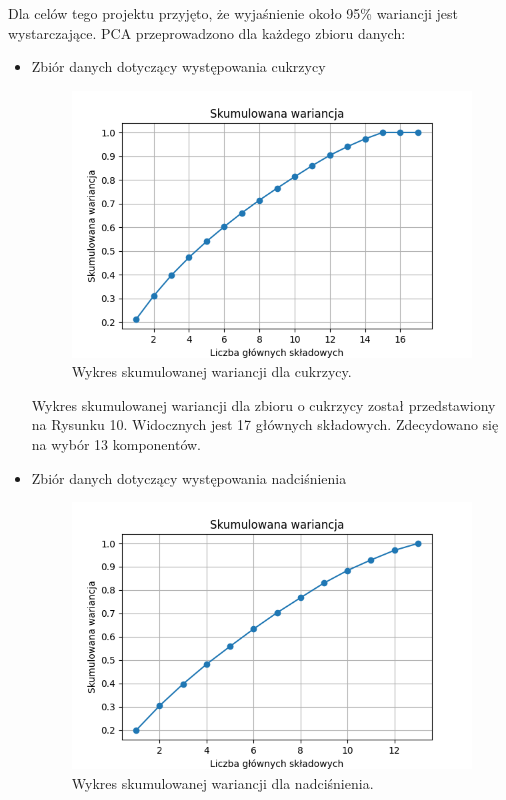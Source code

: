 \documentclass[onecolumn,12pt]{article}
\begin{document}
\vspace{8pt}
\noindent
Dla celów tego projektu przyjęto, że wyjaśnienie około 95\% wariancji jest wystarczające. PCA przeprowadzono dla każdego zbioru danych:
\begin{itemize}
\item{Zbiór danych dotyczący występowania cukrzycy}

\begin{figure}[H]
    \centering
    \includegraphics[width=0.8\linewidth]{raport/graphs/skumulowana_wariancja_cukrzyca.png}
    \captionsetup{justification=centering}
    \caption{Wykres skumulowanej wariancji dla cukrzycy.}
\end{figure}

Wykres skumulowanej wariancji dla zbioru o cukrzycy został przedstawiony na Rysunku 10. Widocznych jest 17 głównych składowych. Zdecydowano się na wybór 13 komponentów.

\newpage

\item{Zbiór danych dotyczący występowania nadciśnienia}
\begin{figure}[H]
    \centering
    \includegraphics[width=0.80\linewidth]{raport/graphs/skumulowana_wariancja_nadcisnienie.png}
    \captionsetup{justification=centering}
    \caption{Wykres skumulowanej wariancji dla nadciśnienia.}
\end{figure}


\end{itemize}
\end{document}
